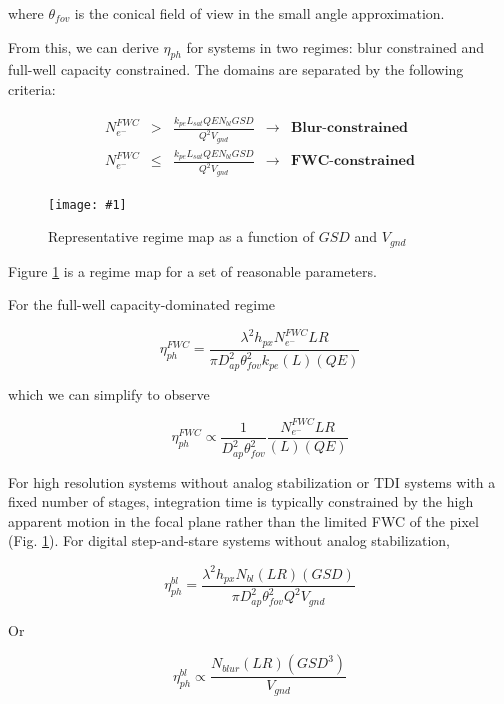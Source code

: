 \documentclass[10pt,journal]{IEEEtran}  %
\newcommand{\includefigure}[3]
{
  \begin{figure}[h!]
  \centering
  \texttt{[image: \#1]}
  \caption[]{#3}
  \label{#2}
  \end{figure}
}
\begin{document}
where $\theta_{fov}$ is the conical field of view in the small angle approximation.

From this, we can derive $\eta_{ph}$ for systems in two regimes: blur constrained and full-well capacity constrained.  The domains are separated by the following criteria:

\begin{align*}
    N_{e^-}^{FWC} &>& \frac{k_{pe}L_{sat}QE N_{bl} GSD}{Q^2 V_{gnd}} & \rightarrow &  \textbf{Blur-constrained} \\
    N_{e^-}^{FWC} &\leq& \frac{k_{pe}L_{sat}QE N_{bl} GSD}{Q^2 V_{gnd}} & \rightarrow &  \textbf{FWC-constrained}
\end{align*}

\includefigure{figures/blur_fwc_regime.pgf}{fig:eta_regime}{Representative regime map as a function of $GSD$ and $V_{gnd}$}

Figure \ref{fig:eta_regime} is a regime map for a set of reasonable parameters.

For the full-well capacity-dominated regime

\begin{equation}
    \label{eq:eta_ph_fwc}
    \eta_{ph}^{FWC} = \frac{\lambda^2 h_{px} N_{e^-}^{FWC} LR}{\pi D_{ap}^2 \theta_{fov}^2 k_{pe}(L)(QE)}
\end{equation}

which we can simplify to observe

\begin{equation}
    \label{eq:eta_fwc_scaling}
    \eta_{ph}^{FWC} \propto \frac{1}{D_{ap}^2 \theta_{fov}^2} \frac{N_{e^-}^{FWC} LR}{(L)(QE)}
\end{equation}

For high resolution systems without analog stabilization or TDI systems with a fixed number of stages, integration time is typically constrained by the high apparent motion in the focal plane rather than the limited FWC of the pixel (Fig. \ref{fig:eta_regime}).  For digital step-and-stare systems without analog stabilization,

\begin{equation}
    \label{eq:eta_ph_blur}
    \eta_{ph}^{bl} = \frac{\lambda^2 h_{px}N_{bl}(LR)(GSD)}{\pi D_{ap}^2\theta_{fov}^2 Q^2 V_{gnd}}
\end{equation}

Or 

\begin{equation}
    \label{eq:eta_blur_scaling}
    \eta_{ph}^{bl} \propto  \frac{N_{blur} (LR) (GSD^3)}{V_{gnd}}
\end{equation}
\end{document}

